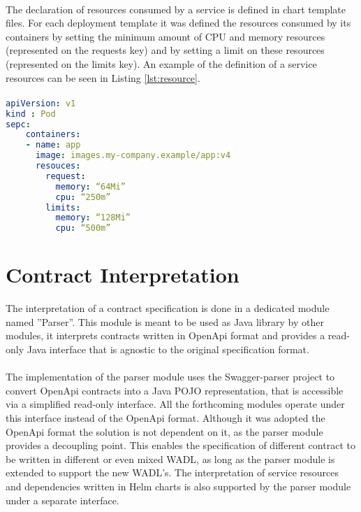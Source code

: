 \paragraph{}

The declaration of resources consumed by a service is defined in chart template files.
For each deployment template it was defined the resources consumed by its containers by
setting the minimum amount of CPU and memory resources (represented on the requests key) and by setting a limit on these resources (represented on the limits key).
An example of the definition of a service resources can be seen in Listing \ref{lst:resource}.

\paragraph{}

\begin{lstlisting}[language=yaml, caption=Helm template resources example, label=lst:resource]
apiVersion: v1
kind : Pod
sepc:
    containers:
    - name: app
      image: images.my-company.example/app:v4
      resouces:
        request:
          memory: “64Mi”
          cpu: “250m”
        limits:
          memory: “128Mi”
          cpu: “500m”
\end{lstlisting}

\section{Contract Interpretation} %
\label{sec:contract_interpretation}

The interpretation of a contract specification is done in a dedicated module named ''Parser''.
This module is meant to be used as Java library by other modules,
it interprets contracts written in OpenApi format and provides a read-only Java interface
that is agnostic to the original specification format.

\paragraph{}

The implementation of the parser module uses the Swagger-parser project \cite{swaggerparser} to convert OpenApi contracts into a Java POJO representation, that is accessible via a simplified read-only interface.
All the forthcoming modules operate under this interface instead of the OpenApi format.
Although it was adopted the OpenApi format the solution is not dependent on it, as the parser module provides a decoupling point.
This enables the specification of different contract to be written in different or even mixed WADL,
as long as the parser module is extended to support the new WADL's.
The interpretation of service resources and dependencies written in Helm charts is also supported by the parser module under a separate interface.

